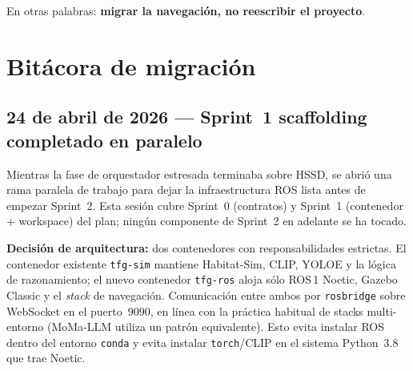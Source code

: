 \documentclass[11pt,a4paper]{article}
\begin{document}
En otras palabras: \textbf{migrar la navegación, no reescribir el proyecto}.

\section{Bitácora de migración}

\subsection*{24 de abril de 2026 --- Sprint~1 scaffolding completado en paralelo}

Mientras la fase de orquestador estresada terminaba sobre HSSD, se
abrió una rama paralela de trabajo para dejar la infraestructura ROS
lista antes de empezar Sprint~2. Esta sesión cubre Sprint~0 (contratos)
y Sprint~1 (contenedor + workspace) del plan; ningún componente de
Sprint~2 en adelante se ha tocado.

\textbf{Decisión de arquitectura:} dos contenedores con
responsabilidades estrictas. El contenedor existente \texttt{tfg-sim}
mantiene Habitat-Sim, CLIP, YOLOE y la lógica de razonamiento; el
nuevo contenedor \texttt{tfg-ros} aloja sólo ROS\,1 Noetic, Gazebo
Classic y el \emph{stack} de navegación. Comunicación entre ambos por
\texttt{rosbridge} sobre WebSocket en el puerto~9090, en línea con la
práctica habitual de stacks multi-entorno (MoMa-LLM utiliza un patrón
equivalente). Esto evita instalar ROS dentro del entorno
\texttt{conda} y evita instalar \texttt{torch}/CLIP en el sistema
Python~3.8 que trae Noetic.
\end{document}
